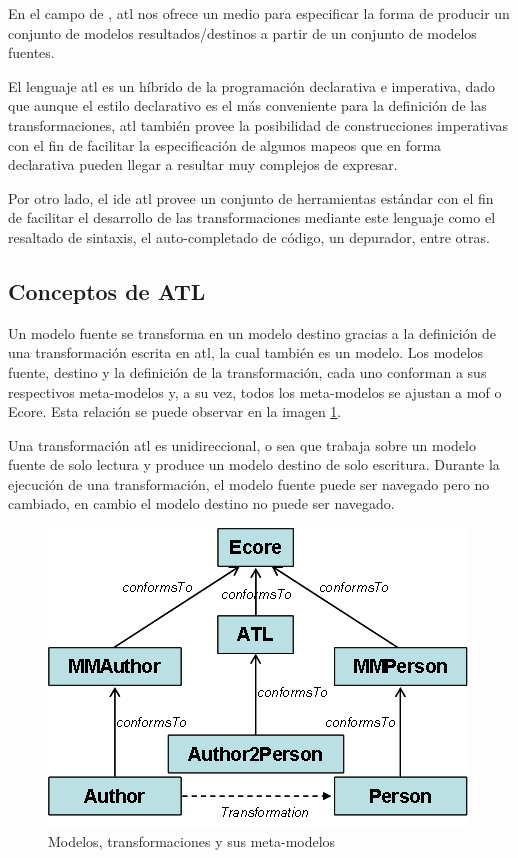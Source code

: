 \documentclass[a4paper,12pt,oneside,spanish]{book}
\begin{document}
En el campo de , \gls{atl} nos ofrece un medio para especificar la forma de producir un conjunto de modelos resultados/destinos a partir de un conjunto de modelos fuentes.

El lenguaje \gls{atl} es un híbrido de la programación declarativa e imperativa, dado que aunque el estilo declarativo es el más conveniente para la definición de las transformaciones, \gls{atl} también provee la posibilidad de construcciones imperativas con el fin de facilitar la especificación de algunos mapeos que en forma declarativa pueden llegar a resultar muy complejos de expresar.

Por otro lado, el \gls{ide} \gls{atl} provee un conjunto de herramientas estándar con el fin de facilitar el desarrollo de las transformaciones mediante este lenguaje como el  resaltado de sintaxis, el auto-completado de código, un depurador, entre otras.



\subsection{Conceptos de ATL}

Un modelo fuente se transforma en un modelo destino gracias a la definición de una transformación escrita en \gls{atl}, la cual también es un modelo. Los modelos fuente, destino y la definición de la transformación, cada uno conforman a sus respectivos meta-modelos y, a su vez, todos los meta-modelos se ajustan a \gls{mof} o Ecore. Esta relación se puede observar en la imagen \ref{ATL-concepts}.

Una transformación \gls{atl} es unidireccional, o sea que trabaja sobre un modelo fuente de solo lectura y produce un modelo destino de solo escritura. Durante la ejecución de una transformación, el modelo fuente puede ser navegado pero no cambiado, en cambio el modelo destino no puede ser navegado.

\begin{figure}[hbtp]
\centering
\includegraphics[scale=.65]{./img/ATL-concepts}
\caption{Modelos, transformaciones y sus meta-modelos}
\label{ATL-concepts}
\end{figure}
\end{document}
